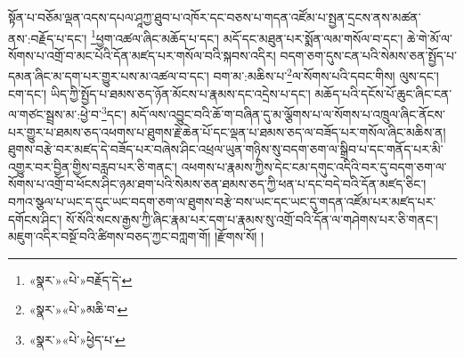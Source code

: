 སྟོན་པ་བཅོམ་ལྡན་འདས་དཔལ་ཤཱཀྱ་ཐུབ་པ་འཁོར་དང་བཅས་པ་གདན་འཛོམ་པ་སྤྱན་དྲངས་ནས་མཚན་ནས་:བརྗོད་པ་དང་། \footnote{«སྣར་»«པེ་»བརྗོད་དེ་}ཕྱག་འཚལ་ཞིང་མཆོད་པ་དང་། མདོ་དང་མཐུན་པར་སྨོན་ལམ་གསོལ་བ་དང་། ཆེ་གེ་མོ་ལ་སོགས་པ་འགྲོ་བ་མང་པོའི་དོན་མཛད་པར་གསོལ་བའི་སྐབས་འདིར། བདག་ཅག་དུས་ངན་པའི་སེམས་ཅན་སྤྱོད་པ་དམན་ཞིང་མ་དག་པར་གྱུར་པས་མ་འཚལ་བ་དང་། བག་མ་:མཆིས་པ་\footnote{«སྣར་»«པེ་»མཆི་བ་}ལ་སོགས་པའི་དབང་གིས། ལུས་དང་། ངག་དང་། ཡིད་ཀྱི་སྤྱོད་པ་ཐམས་ཅད་ཉོན་མོངས་པ་རྣམས་དང་འདྲེས་པ་དང་། མཆོད་པའི་དངོས་པོ་ཆུང་ཞིང་ངན་ལ་གཙང་སྦྲས་མ་:ཕྱེ་བ་\footnote{«སྣར་»«པེ་»ཕྱེད་པ་}དང་། མདོ་ལས་འབྱུང་བའི་ཆོ་ག་བཞིན་དུ་མ་ལྕོགས་པ་ལ་སོགས་པ་འཁྲུལ་ཞིང་ནོངས་པར་གྱུར་པ་ཐམས་ཅད་འཕགས་པ་ཐུགས་རྗེ་ཆེན་པོ་དང་ལྡན་པ་ཐམས་ཅད་ལ་བཟོད་པར་གསོལ་ཞིང་མཆིས་ན། ཐུགས་བརྩེ་བར་མཛད་དེ་བཟོད་པར་བཞེས་ཤིང་འཕྲལ་ཡུན་གཉིས་སུ་བདག་ཅག་ལ་སྒྲིབ་པ་དང་གནོད་པར་མི་འགྱུར་བར་བྱིན་གྱིས་བརླབ་པར་ཅི་གནང་། འཕགས་པ་རྣམས་ཀྱིས་དེང་ངམ་དགུང་འདིའི་བར་དུ་བདག་ཅག་ལ་སོགས་པ་འགྲོ་བ་ཕོངས་ཤིང་ཉམ་ཐག་པའི་སེམས་ཅན་ཐམས་ཅད་ཀྱི་ཕན་པ་དང་བདེ་བའི་དོན་མཛད་ཅིང་། བཀའ་སྩལ་པ་ཡང་ད་དུང་ཡང་བདག་ཅག་ལ་ཐུགས་བརྩེ་བས་ཡང་དང་ཡང་དུ་གདན་འཛོམ་པར་མཛད་པར་དགོངས་ཤིང་། སོ་སོའི་སངས་རྒྱས་ཀྱི་ཞིང་རྣམ་པར་དག་པ་རྣམས་སུ་འགྲོ་བའི་དོན་ལ་གཤེགས་པར་ཅི་གནང་། མཇུག་འདིར་བསྔོ་བའི་ཚིགས་བཅད་ཀྱང་བཀླག་གོ། །རྫོགས་སོ། ། 
